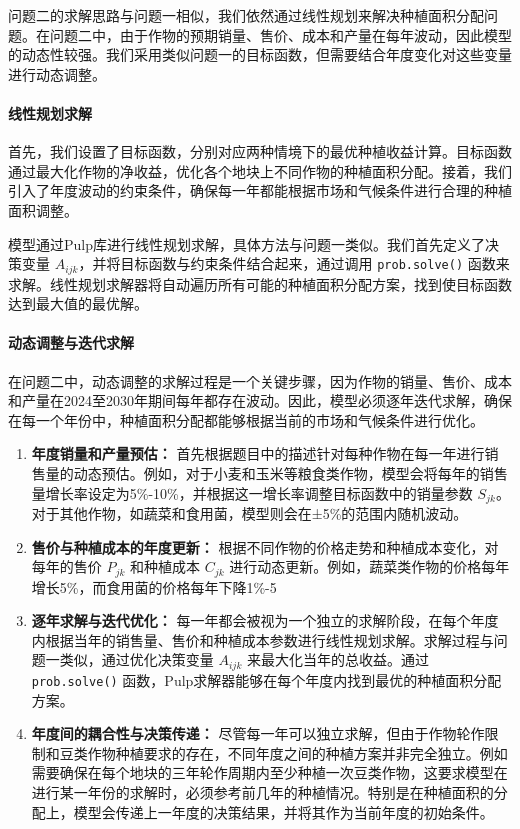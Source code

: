 \documentclass[12pt,a4paper]{nmmcm}
\begin{document}
问题二的求解思路与问题一相似，我们依然通过线性规划来解决种植面积分配问题。在问题二中，由于作物的预期销量、售价、成本和产量在每年波动，因此模型的动态性较强。我们采用类似问题一的目标函数，但需要结合年度变化对这些变量进行动态调整。

\paragraph{线性规划求解}

首先，我们设置了目标函数，分别对应两种情境下的最优种植收益计算。目标函数通过最大化作物的净收益，优化各个地块上不同作物的种植面积分配。接着，我们引入了年度波动的约束条件，确保每一年都能根据市场和气候条件进行合理的种植面积调整。

模型通过Pulp库进行线性规划求解，具体方法与问题一类似。我们首先定义了决策变量 $A_{ijk}$，并将目标函数与约束条件结合起来，通过调用 \texttt{prob.solve()} 函数来求解。线性规划求解器将自动遍历所有可能的种植面积分配方案，找到使目标函数达到最大值的最优解。

\paragraph{动态调整与迭代求解}

在问题二中，动态调整的求解过程是一个关键步骤，因为作物的销量、售价、成本和产量在2024至2030年期间每年都存在波动。因此，模型必须逐年迭代求解，确保在每一个年份中，种植面积分配都能够根据当前的市场和气候条件进行优化。

\begin{enumerate}
    \item \textbf{年度销量和产量预估：} 首先根据题目中的描述针对每种作物在每一年进行销售量的动态预估。例如，对于小麦和玉米等粮食类作物，模型会将每年的销售量增长率设定为5\%-10\%，并根据这一增长率调整目标函数中的销量参数 $S_{jk}$。对于其他作物，如蔬菜和食用菌，模型则会在±5\%的范围内随机波动。
    
    \item \textbf{售价与种植成本的年度更新：} 根据不同作物的价格走势和种植成本变化，对每年的售价 $P_{jk}$ 和种植成本 $C_{jk}$ 进行动态更新。例如，蔬菜类作物的价格每年增长5\%，而食用菌的价格每年下降1\%-5%
    
    \item \textbf{逐年求解与迭代优化：} 每一年都会被视为一个独立的求解阶段，在每个年度内根据当年的销售量、售价和种植成本参数进行线性规划求解。求解过程与问题一类似，通过优化决策变量 $A_{ijk}$ 来最大化当年的总收益。通过 \texttt{prob.solve()} 函数，Pulp求解器能够在每个年度内找到最优的种植面积分配方案。
    
    \item \textbf{年度间的耦合性与决策传递：} 尽管每一年可以独立求解，但由于作物轮作限制和豆类作物种植要求的存在，不同年度之间的种植方案并非完全独立。例如需要确保在每个地块的三年轮作周期内至少种植一次豆类作物，这要求模型在进行某一年份的求解时，必须参考前几年的种植情况。特别是在种植面积的分配上，模型会传递上一年度的决策结果，并将其作为当前年度的初始条件。
\end{enumerate}
\end{document}
